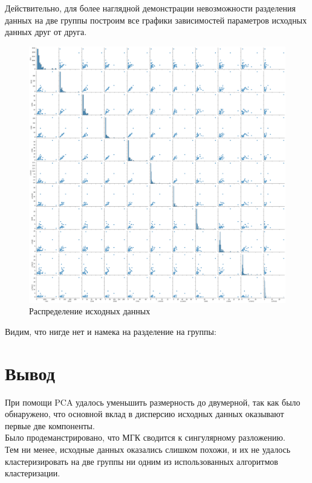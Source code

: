 \documentclass[a4]{article}
\begin{document}
	Действительно, для более наглядной демонстрации невозможности разделения данных на две группы построим все графики зависимостей параметров исходных данных друг от друга.\\
	\begin{figure}[h!]
		\includegraphics[width=\textwidth]{data_disp_cutoff.png}\caption[Распределение исходных данных]{Распределение исходных данных}
	\end{figure} 
	Видим, что нигде нет и намека на разделение на группы:\\
	
	\newpage
	\section{Вывод}
	
	При помощи PCA удалось уменьшить размерность до двумерной, так как было обнаружено, что основной вклад в дисперсию исходных данных оказывают первые две компоненты. \\
	
	Было продеманстрировано, что МГК сводится к сингулярному разложению. \\
	
	Тем ни менее, исходные данных оказались слишком похожи, и их не удалось кластеризировать на две группы ни одним из использованных алгоритмов кластеризации.
\end{document}
